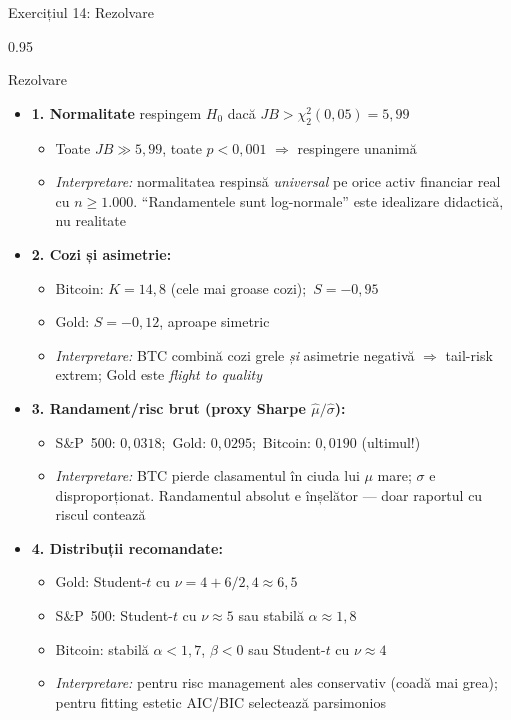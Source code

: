 \documentclass[9pt, aspectratio=169, t]{beamer}
\begin{document}
\begin{frame}[shrink=25]{Exercițiul 14: Rezolvare}
\begin{cminipage}{0.95\textwidth}
\begin{exampleblock}{Rezolvare}
\begin{itemize}\setlength{\itemsep}{0pt}
    \item \textbf{1. Normalitate} \quad respingem $H_0$ dacă $JB > \chi^2_2(0{,}05) = 5{,}99$
    \begin{itemize}\setlength{\itemsep}{0pt}
        \item Toate $JB \gg 5{,}99$, toate $p < 0{,}001$ $\Rightarrow$ respingere unanimă
        \item \textit{Interpretare:} normalitatea respinsă \emph{universal} pe orice activ financiar real cu $n \ge 1.000$. ``Randamentele sunt log-normale'' este idealizare didactică, nu realitate
    \end{itemize}
    \item \textbf{2. Cozi și asimetrie:}
    \begin{itemize}\setlength{\itemsep}{0pt}
        \item Bitcoin: $K = 14{,}8$ (cele mai groase cozi);\ $S = -0{,}95$
        \item Gold: $S = -0{,}12$, aproape simetric
        \item \textit{Interpretare:} BTC combină cozi grele \emph{și} asimetrie negativă $\Rightarrow$ tail-risk extrem; Gold este \emph{flight to quality}
    \end{itemize}
    \item \textbf{3. Randament/risc brut (proxy Sharpe $\hat\mu/\hat\sigma$):}
    \begin{itemize}\setlength{\itemsep}{0pt}
        \item S\&P~500: $0{,}0318$;\ Gold: $0{,}0295$;\ Bitcoin: $0{,}0190$ (ultimul!)
        \item \textit{Interpretare:} BTC pierde clasamentul în ciuda lui $\mu$ mare; $\sigma$ e disproporționat. Randamentul absolut e înșelător --- doar raportul cu riscul contează
    \end{itemize}
    \item \textbf{4. Distribuții recomandate:}
    \begin{itemize}\setlength{\itemsep}{0pt}
        \item Gold: Student-$t$ cu $\nu = 4 + 6/2{,}4 \approx 6{,}5$
        \item S\&P~500: Student-$t$ cu $\nu \approx 5$ sau stabilă $\alpha \approx 1{,}8$
        \item Bitcoin: stabilă $\alpha < 1{,}7$, $\beta < 0$ sau Student-$t$ cu $\nu \approx 4$
        \item \textit{Interpretare:} pentru risc management ales conservativ (coadă mai grea); pentru fitting estetic AIC/BIC selectează parsimonios
    \end{itemize}
\end{itemize}
\end{exampleblock}
\end{cminipage}
\end{frame}
\end{document}
